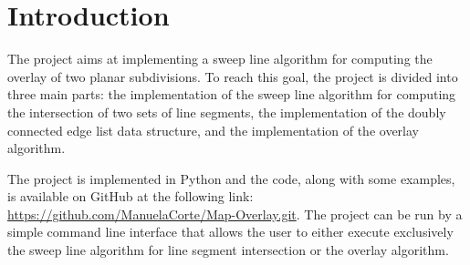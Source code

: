 \section{Introduction}
The project aims at implementing a sweep line algorithm for computing the overlay of two planar subdivisions. To reach this goal, the project is divided into three main parts: the implementation of the sweep line algorithm for computing the intersection of two sets of line segments, the implementation of the doubly connected edge list data structure, and the implementation of the overlay algorithm.

The project is implemented in Python and the code, along with some examples, is available on GitHub at the following link: \url{https://github.com/ManuelaCorte/Map-Overlay.git}. The project can be run by a simple command line interface that allows the user to either execute exclusively the sweep line algorithm for line segment intersection or the overlay algorithm.
